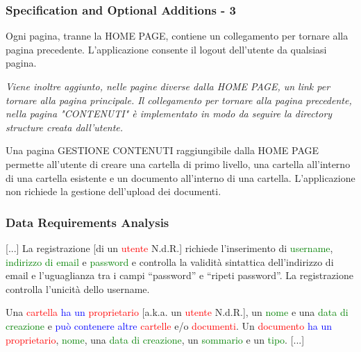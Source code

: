 \documentclass[aspectratio=169, dvipsnames]{beamer}
\begin{document}
\begin{frame}
    \frametitle{Specification and Optional Additions - 3}
    Ogni pagina, tranne la HOME PAGE, contiene un collegamento per tornare alla pagina precedente. L’applicazione
    consente il logout dell’utente da qualsiasi pagina. \newline

    \textit{Viene inoltre aggiunto, nelle pagine diverse dalla HOME PAGE, un link per tornare alla pagina principale.
        Il collegamento per tornare alla pagina precedente, nella pagina "CONTENUTI" è implementato in modo da seguire
        la directory structure creata dall'utente.} \newline

    Una pagina GESTIONE CONTENUTI raggiungibile dalla HOME PAGE permette all’utente di creare una cartella di primo
    livello, una cartella all’interno di una cartella esistente e un documento all’interno di una cartella.
    L’applicazione non richiede la gestione dell’upload dei documenti.
\end{frame}

\begin{frame}
    \frametitle{Data Requirements Analysis}
    [...] La registrazione [di un \textcolor{Red}{utente} N.d.R.] richiede l’inserimento di
    \textcolor{Green}{username}, \textcolor{Green}{indirizzo di email} e \textcolor{Green}{password} e controlla la
    validità sintattica dell’indirizzo di email e l’uguaglianza tra i campi “password” e “ripeti password”. La
    registrazione controlla l’unicità dello username. \newline

    Una \textcolor{Red}{cartella} \textcolor{Blue}{ha un} \textcolor{Red}{proprietario} [a.k.a. un
        \textcolor{Red}{utente} N.d.R.], un \textcolor{Green}{nome} e una \textcolor{Green}{data di creazione} e
    \textcolor{Blue}{può contenere altre} \textcolor{Red}{cartelle} e/o \textcolor{Red}{documenti}. Un
    \textcolor{Red}{documento} \textcolor{Blue}{ha un} \textcolor{Red}{proprietario}, \textcolor{Green}{nome}, una
    \textcolor{Green}{data di creazione}, un \textcolor{Green}{sommario} e un \textcolor{Green}{tipo}.
    [...]\footnotemark{}

\end{frame}
\end{document}

